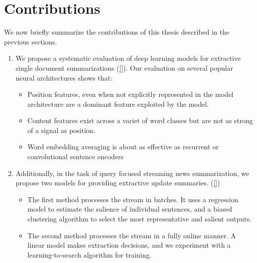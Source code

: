 \section{Contributions}

We now briefly summarize the contributions of this thesis described
in the previous sections.


\begin{enumerate}
        \item We propose a systematic evaluation of deep learning models
            for extractive single document summarizations (\autoref{}). 
            Our evaluation on several popular neural architectures shows 
            that:
            \begin{itemize}
                \item Position features, even when not explicitly represented
                    in the model architecture are a dominant feature
                    exploited by the model.
                \item Content features exist across a variet of word classes
                    but are not as strong of a signal as position.
                \item Word embedding averaging is about as effective as 
                    recurrent or convolutional sentence encoders 
            \end{itemize}
        \item Additionally, in the task of query focused streaming news 
            summarization, we propose two models for providing 
            extractive update summaries. (\autoref{})
            \begin{itemize}

                \item The first method processes the stream in  batches. 
                    It uses a regression model
                    to estimate the salience of individual 
                    sentences, and a biased clustering algorithm to select
                    the most representative and salient outputs.
                \item The second method processes the stream in a fully
                    online manner. A linear model makes extraction
                    decisions, and we experiment with a learning-to-search
                    algorithm for training. 
            \end{itemize}
    \end{enumerate}


